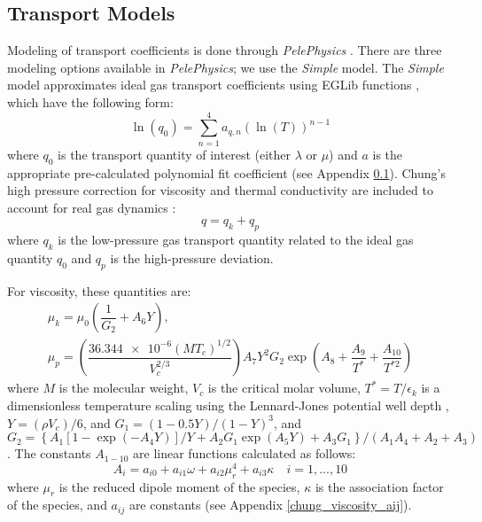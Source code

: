 \subsection{Transport Models}
Modeling of transport coefficients is done through \textit{PelePhysics} \cite{}. There are three modeling options available in \textit{PelePhysics}; we use the \textit{Simple} model. The \textit{Simple} model approximates ideal gas transport coefficients using EGLib functions \cite{ERN1995105}, which have the following form:
\begin{equation} \label{EGLib}
\ln{(q_0)} = \sum\limits_{n=1}^{4} a_{q,n}\left( \ln{(T)}\right)^{n-1}
\end{equation}
where $q_0$ is the transport quantity of interest (either $\lambda$ or $\mu$) and $a$ is the appropriate pre-calculated polynomial fit coefficient (see Appendix \ref{}). Chung's high pressure correction for viscosity and thermal conductivity are included to account for real gas dynamics \cite{chung:1988}: 
\begin{equation} \label{chung_general}
q = q_k + q_p
\end{equation}
where $q_k$ is the low-pressure gas transport quantity related to the ideal gas quantity $q_0$ and $q_p$ is the high-pressure deviation. 

For viscosity, these quantities are:
\begin{equation}
\begin{split}
\mu_k = \mu_0 \left( \dfrac{1}{G_2} + A_6 Y \right), \\ 
\mu_p = \left(\dfrac{\num{36.344e-6}(MT_c)^{1/2}}{V_c^{2/3}}\right)A_7Y^2G_2\exp(A_8 + \dfrac{A_9}{T^*} + \dfrac{A_{10}}{T^{*2}}) 
\end{split}
\end{equation}
where $M$ is the molecular weight, $V_c$ is the critical molar volume, $T^* = T/\epsilon_k$ is a dimensionless temperature scaling using the Lennard-Jones potential well depth \cite{}, $Y = (\rho V_c)/6$, and $G_1 = (1-0.5Y)/(1-Y)^3$, and $G_2 = \left\{A_1\left[   1-\exp(-A_4Y)\right]/Y + A_2G_1\exp(A_5Y) + A_3G_1 \right\}/(A_1A_4 + A_2 + A_3)$. The constants $A_{1-10}$ are linear functions calculated as follows: 
\begin{equation}
A_i = a_{i0} + a_{i1} \omega + a_{i2} \mu_r^4 + a_{i3} \kappa \quad i = 1,..., 10
\end{equation} 
where $\mu_r$ is the reduced dipole moment of the species, $\kappa$ is the association factor of the species, and $a_{ij}$ are constants (see Appendix \ref{chung_viscosity_aij}).  

